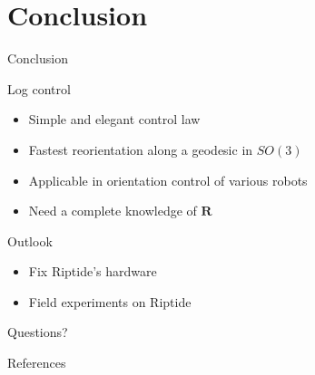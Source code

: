 \documentclass[10pt, xcolor={usenames, dvipsnames}]{beamer}
\begin{document}
    \section{Conclusion}

        \begin{frame}{Conclusion}
            \centering
            \begin{minipage}{0.8\textwidth}
                \begin{block}{Log control}
                    \vspace*{.25cm}
                    \begin{itemize}
                        \item Simple and elegant control law
                        \item Fastest reorientation along a geodesic in $SO(3)$
                        \item Applicable in orientation control of various robots 
                        \item Need a complete knowledge of $\mathbf{R}$
                    \end{itemize}
                \end{block}
                \begin{block}{Outlook}
                    \begin{itemize}
                        \item Fix Riptide's hardware
                        \item Field experiments on Riptide
                    \end{itemize}
                \end{block}
            \end{minipage}
        \end{frame}

    \appendix

        \begin{frame}[standout]
            Questions?
        \end{frame}

        \begin{frame}[allowframebreaks]{References}

            \printbibliography[sorting=nyt]

        \end{frame}
\end{document}
